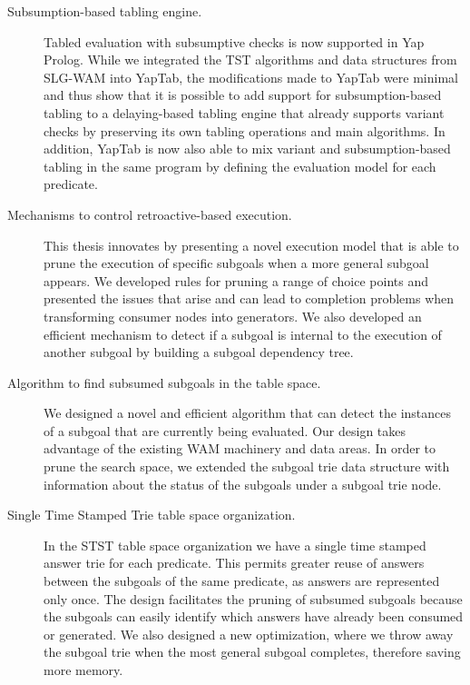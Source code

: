 \begin{description}
   \item[Subsumption-based tabling engine.] Tabled evaluation with subsumptive checks is now supported in Yap Prolog.
   While we integrated the TST algorithms and data structures from SLG-WAM into YapTab, the modifications made to
   YapTab were minimal and thus show that it is possible to add support for subsumption-based tabling to a delaying-based
   tabling engine that already supports variant checks by preserving its own tabling operations and main algorithms.
   In addition, YapTab is now also able to mix variant and subsumption-based tabling in the same program by defining
   the evaluation model for each predicate.
   
   \item[Mechanisms to control retroactive-based execution.] This thesis innovates by presenting a novel execution model
   that is able to prune the execution of specific subgoals when a more general subgoal appears. We developed rules
   for pruning a range of choice points and presented the issues that arise and can lead to completion problems when
   transforming consumer nodes into generators. We also developed an efficient mechanism to detect if a subgoal is
   internal to the execution of another subgoal by building a subgoal dependency tree.
   
   \item[Algorithm to find subsumed subgoals in the table space.] We designed a novel and efficient algorithm that
   can detect the instances of a subgoal that are currently being evaluated. Our design takes advantage of the existing
   WAM machinery and data areas. In order to prune the search space, we extended the subgoal trie data structure with
   information about the status of the subgoals under a subgoal trie node.
   
   \item[Single Time Stamped Trie table space organization.] In the STST table space organization we have a single time
   stamped answer trie for each predicate. This permits greater reuse of answers between
   the subgoals of the same predicate, as answers are represented only once. The design facilitates the pruning of
   subsumed subgoals because the subgoals can easily identify which answers have already been consumed or generated.
   We also designed a new optimization, where we throw away the subgoal trie when the most general subgoal completes,
   therefore saving more memory.
   

\end{description}
